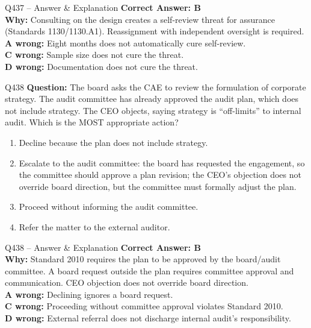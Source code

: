 \documentclass[aspectratio=169,10pt]{beamer}
\begin{document}
	\begin{frame}[t]{Q437 -- Answer \& Explanation}
		\small
		\textbf{Correct Answer: B} \\[4pt]
		\textbf{Why:} Consulting on the design creates a self-review threat for assurance (Standards 1130/1130.A1). Reassignment with independent oversight is required. \\[4pt]
		\textbf{A wrong:} Eight months does not automatically cure self-review. \\[2pt]
		\textbf{C wrong:} Sample size does not cure the threat. \\[2pt]
		\textbf{D wrong:} Documentation does not cure the threat.
	\end{frame}
	
	\begin{frame}[t]{Q438}
		\small
		\textbf{Question:} The board asks the CAE to review the formulation of corporate strategy. The audit committee has already approved the audit plan, which does not include strategy. The CEO objects, saying strategy is ``off-limits'' to internal audit. Which is the MOST appropriate action?
		\begin{enumerate}[label=\Alph*.,itemsep=1pt,topsep=2pt]
			\item Decline because the plan does not include strategy.
			\item Escalate to the audit committee: the board has requested the engagement, so the committee should approve a plan revision; the CEO's objection does not override board direction, but the committee must formally adjust the plan.
			\item Proceed without informing the audit committee.
			\item Refer the matter to the external auditor.
		\end{enumerate}
	\end{frame}
	
	\begin{frame}[t]{Q438 -- Answer \& Explanation}
		\small
		\textbf{Correct Answer: B} \\[4pt]
		\textbf{Why:} Standard 2010 requires the plan to be approved by the board/audit committee. A board request outside the plan requires committee approval and communication. CEO objection does not override board direction. \\[4pt]
		\textbf{A wrong:} Declining ignores a board request. \\[2pt]
		\textbf{C wrong:} Proceeding without committee approval violates Standard 2010. \\[2pt]
		\textbf{D wrong:} External referral does not discharge internal audit's responsibility.
	\end{frame}
	
\end{document}
